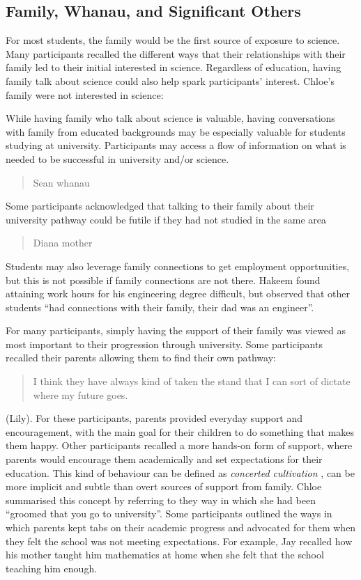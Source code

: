 \subsection{Family, Whanau, and Significant Others}
For most students, the family would be the first source of exposure to science. Many participants recalled the different ways that their relationships with their family led to their initial interested in science. 
Regardless of education, having family talk about science could also help spark participants' interest. Chloe's family were not interested in science: 

While having family who talk about science is valuable, having conversations with family from educated backgrounds may be especially valuable for students studying at university. Participants may access a flow of information on what is needed to be successful in university and/or science. \blockquote{Sean whanau}. Some participants acknowledged that talking to their family about their university pathway could be futile if they had not studied in the same area \blockquote{Diana mother}.  Students may also leverage family connections to get employment opportunities, but this is not possible if family connections are not there. Hakeem found attaining work hours for his engineering degree difficult, but observed that other students ``had connections with their family, their dad was an engineer''. 

For many participants, simply having the support of their family was viewed as most important to their progression through university. Some participants recalled their parents allowing them to find their own pathway: \blockquote{I think they have always kind of taken the stand that I can sort of dictate where my future goes.} (Lily). For these participants, parents provided everyday support and encouragement, with the main goal for their children to do something that makes them happy. Other participants recalled a more hands-on form of support, where parents would encourage them academically and set expectations for their education. This kind of behaviour can be defined as \textit{concerted cultivation} \citep{lareau2011unequal}, can be more implicit and subtle than overt sources of support from family. Chloe summarised this concept by referring to they way in which she had been ``groomed that you go to university''. Some participants outlined the ways in which parents kept tabs on their academic progress and advocated for them when they felt the school was not meeting expectations. For example, Jay recalled how his mother taught him mathematics at home when she felt that the school teaching him enough.

